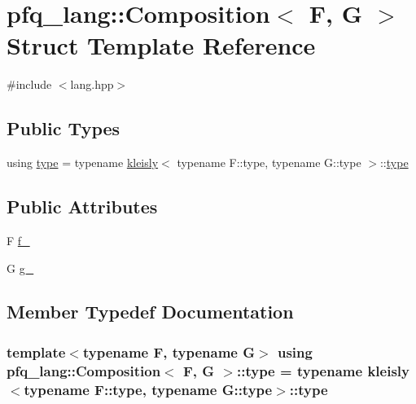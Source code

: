 \hypertarget{structpfq__lang_1_1Composition}{\section{pfq\+\_\+lang\+:\+:Composition$<$ F, G $>$ Struct Template Reference}
\label{structpfq__lang_1_1Composition}
}


{\ttfamily \#include $<$lang.\+hpp$>$}

\subsection*{Public Types}
\begin{DoxyCompactItemize}
\item 
using \hyperlink{structpfq__lang_1_1Composition_a60d50413f2357666cec82a4026c87b65}{type} = typename \hyperlink{structpfq__lang_1_1kleisly}{kleisly}$<$ typename F\+::type, typename G\+::type $>$\+::\hyperlink{structpfq__lang_1_1Composition_a60d50413f2357666cec82a4026c87b65}{type}
\end{DoxyCompactItemize}
\subsection*{Public Attributes}
\begin{DoxyCompactItemize}
\item 
F \hyperlink{structpfq__lang_1_1Composition_ac2acb2594f7648731422581b9f2f63b0}{f\+\_\+}
\item 
G \hyperlink{structpfq__lang_1_1Composition_a257ccfaae7168eb34420f23c685f3d41}{g\+\_\+}
\end{DoxyCompactItemize}


\subsection{Member Typedef Documentation}
\hypertarget{structpfq__lang_1_1Composition_a60d50413f2357666cec82a4026c87b65}{
\subsubsection[{type}]{\setlength{\rightskip}{0pt plus 5cm}template$<$typename F, typename G$>$ using {\bf pfq\+\_\+lang\+::\+Composition}$<$ F, G $>$\+::{\bf type} =  typename {\bf kleisly}$<$typename F\+::type, typename G\+::type$>$\+::{\bf type}}}\label{structpfq__lang_1_1Composition_a60d50413f2357666cec82a4026c87b65}


